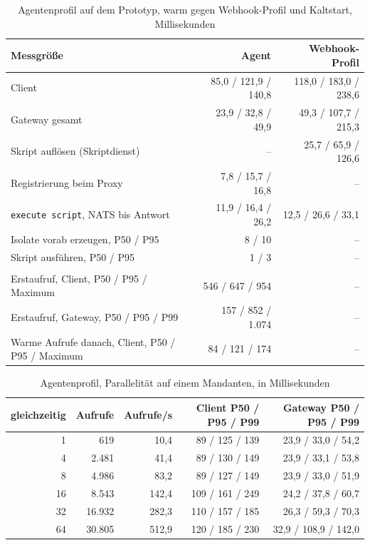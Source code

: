 \begin{table}[H]
  \caption{Agentenprofil auf dem Prototyp, warm gegen Webhook-Profil und Kaltstart, Millisekunden}
  \label{tab:agent-latenz}
  \footnotesize
  \begin{tabularx}{\textwidth}{@{}>{\RaggedRight\arraybackslash}X r r@{}}
    \hline
    Messgröße & Agent & Webhook-Profil \\
    \hline
    Client & 85,0 / 121,9 / 140,8 & 118,0 / 183,0 / 238,6 \\
    Gateway gesamt & 23,9 / 32,8 / 49,9 & 49,3 / 107,7 / 215,3 \\
    Skript auflösen (Skriptdienst) & -- & 25,7 / 65,9 / 126,6 \\
    Registrierung beim Proxy & 7,8 / 15,7 / 16,8 & -- \\
    \texttt{execute script}, NATS bis Antwort & 11,9 / 16,4 / 26,2 & 12,5 / 26,6 / 33,1 \\
    Isolate vorab erzeugen, P50 / P95 & 8 / 10 & -- \\
    Skript ausführen, P50 / P95 & 1 / 3 & -- \\
    \multicolumn{3}{@{}l}{\emph{Kaltstart}} \\
    Erstaufruf, Client, P50 / P95 / Maximum & 546 / 647 / 954 & -- \\
    Erstaufruf, Gateway, P50 / P95 / P99 & 157 / 852 / 1.074 & -- \\
    Warme Aufrufe danach, Client, P50 / P95 / Maximum & 84 / 121 / 174 & -- \\
    \hline
  \end{tabularx}
\end{table}

\begin{table}[H]
  \caption{Agentenprofil, Parallelität auf einem Mandanten, in Millisekunden}
  \label{tab:agent-parallel}
  \footnotesize
  \begin{tabularx}{\textwidth}{@{}r r r r r@{}}
    \hline
    gleichzeitig & Aufrufe & Aufrufe/s & Client P50 / P95 / P99 & Gateway P50 / P95 / P99 \\
    \hline
    1 & 619 & 10,4 & 89 / 125 / 139 & 23,9 / 33,0 / 54,2 \\
    4 & 2.481 & 41,4 & 89 / 130 / 149 & 23,9 / 33,1 / 53,8 \\
    8 & 4.986 & 83,2 & 89 / 127 / 149 & 23,9 / 33,0 / 51,9 \\
    16 & 8.543 & 142,4 & 109 / 161 / 249 & 24,2 / 37,8 / 60,7 \\
    32 & 16.932 & 282,3 & 110 / 157 / 185 & 26,3 / 59,3 / 70,3 \\
    64 & 30.805 & 512,9 & 120 / 185 / 230 & 32,9 / 108,9 / 142,0 \\
    \hline
  \end{tabularx}
\end{table}

